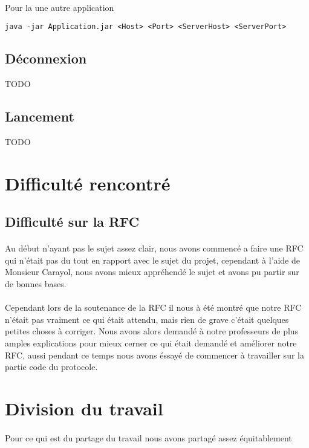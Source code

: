 \documentclass[a4paper,titlepage]{report}
\begin{document}
\paragraph{}
Pour la une autre application
\begin{lstlisting}
java -jar Application.jar <Host> <Port> <ServerHost> <ServerPort>
\end{lstlisting}
\subsection{Déconnexion}
TODO
\subsection{Lancement}
TODO
\section{Difficulté rencontré}
\subsection{Difficulté sur la RFC}
\paragraph{}
Au début n'ayant pas le sujet assez clair, nous avons commencé a faire une RFC qui n'était pas du tout en rapport avec le sujet du projet, cependant à l'aide de Monsieur Carayol, nous avons mieux appréhendé le sujet et avons pu partir sur de bonnes bases.
\paragraph{}
Cependant lors de la soutenance de la RFC il nous à été montré que notre RFC n'était pas vraiment ce qui était attendu, mais rien de grave c'était quelques petites choses à corriger.
Nous avons alors demandé à notre professeurs de plus amples explications pour mieux cerner ce qui était demandé et améliorer notre RFC, aussi pendant ce temps nous avons éssayé de commencer à travailler sur la partie code du protocole.
\section{Division du travail}
\paragraph{}
Pour ce qui est du partage du travail nous avons partagé assez équitablement
\end{document}
